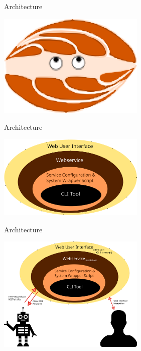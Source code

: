 \documentclass[xcolor=table,10pt,t]{beamer}
\begin{document}
\begin{frame}{Architecture}

    \begin{center}
    \includegraphics[width=70.0mm]{clamup.png}
    \end{center}

\end{frame}

\begin{frame}{Architecture}

    \begin{center}
    \includegraphics[width=70.0mm]{architecture2015_1.png}
    \end{center}

\end{frame}

\begin{frame}{Architecture}

    \begin{center}
    \includegraphics[width=70.0mm]{architecture2015_0.png}
    \end{center}

\end{frame}
\end{document}
